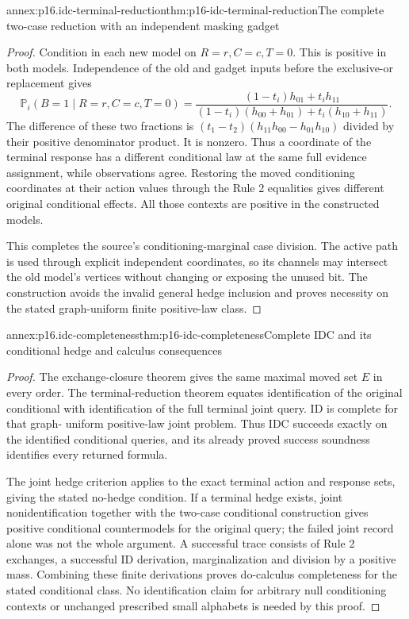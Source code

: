 \begin{annexitem}{annex:p16.idc-terminal-reduction}{thm:p16-idc-terminal-reduction}{The complete two-case reduction with an independent masking gadget}
\begin{proof}
Condition in each new model on \(R=r,C=c,T=0\). This is
positive in both models. Independence of the old and gadget
inputs before the exclusive-or replacement gives
\[
 \mathbb P_i(B=1\mid R=r,C=c,T=0)
  =\frac{(1-t_i)h_{01}+t_i h_{11}}
         {(1-t_i)(h_{00}+h_{01})+t_i(h_{10}+h_{11})}.
\]
The difference of these two fractions is
\((t_1-t_2)(h_{11}h_{00}-h_{01}h_{10})\) divided by
their positive denominator product. It is nonzero. Thus a
coordinate of the terminal response has a different conditional
law at the same full evidence assignment, while observations agree.
Restoring the moved conditioning coordinates at their action values
through the Rule 2 equalities gives different original conditional
effects. All those contexts are positive in the constructed models.

This completes the source's conditioning-marginal case division.
The active path is used through explicit independent coordinates,
so its channels may intersect the old model's vertices without
changing or exposing the unused bit. The construction avoids the
invalid general hedge inclusion and proves necessity on the
stated graph-uniform finite positive-law class.
\end{proof}
\end{annexitem}

\begin{annexitem}{annex:p16.idc-completeness}{thm:p16-idc-completeness}{Complete IDC and its conditional hedge and calculus consequences}
\begin{proof}
The exchange-closure theorem gives the same maximal moved set
\(E\) in every order. The terminal-reduction theorem equates
identification of the original conditional with identification of
the full terminal joint query. ID is complete for that graph-
uniform positive-law joint problem. Thus IDC succeeds exactly
on the identified conditional queries, and its already proved
success soundness identifies every returned formula.

The joint hedge criterion applies to the exact terminal action
and response sets, giving the stated no-hedge condition. If a
terminal hedge exists, joint nonidentification together with the
two-case conditional construction gives positive conditional
countermodels for the original query; the failed joint record
alone was not the whole argument. A successful trace consists
of Rule 2 exchanges, a successful ID derivation, marginalization
and division by a positive mass. Combining these finite derivations
proves do-calculus completeness for the stated conditional class.
No identification claim for arbitrary null conditioning contexts
or unchanged prescribed small alphabets is needed by this proof.
\end{proof}
\end{annexitem}

